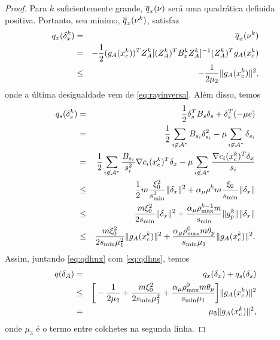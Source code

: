 \begin{proof}
Para $k$ suficientemente grande, $\overline{q}_x(\nu)$ será uma quadrática definida positiva.
 Portanto, seu mínimo, $\overline{q}_x(\nu^k)$, satisfaz
\begin{eqnarray}
 q_x(\delta_x^k) & = & \barra{q}_x(\nu^k) \nonumber \\
& = & -\meio(\gAk{k})^TZ_A^k[(Z_A^k)^T B_x^k Z_A^k]^{-1}(Z_A^k)^T\gAk{k} \nonumber \\
& \leq & - \frac{1}{2\mu_2}\norma{\gAk{k}}^2, \visiblelbl{eq:qdhnx}
\end{eqnarray}
onde a última desigualdade vem de \eqref{eq:rayinversa}.
Além disso, temos
\begin{eqnarray}
 q_s(\delta_s^k) & = & \meio\delta_s^TB_s\delta_s + \delta_s^T(-\mu e) \nonumber \\
& = & \meio \sum_{i \not\in\mathcal{A}^*}B_{s_i}\delta_{s_i}^2 - 
\mu\sum_{i \not\in\mathcal{A}^*}\delta_{s_i} \nonumber \\
& = & \meio\sum_{i \not\in\mathcal{A}^*}\frac{B_{s_i}}{s_i^2} \nabla c_i(\xc{k})^T\delta_x -
\mu \sum_{i \not\in\mathcal{A}^*}\frac{ \nabla c_i(\xc{k})^T\delta_x }{s_i} \nonumber \\
& \leq & \meio m \frac{\xi_0^2}{s_{\min}^2}\norma{\delta_x}^2 + 
\alpha_{\mu}\rho^k m \frac{\xi_0}{s_{\min}} \norma{\delta_x} \nonumber \\
& \leq & \frac{m \xi_0^2}{2 s_{\min}}\norma{\delta_x}^2 + \frac { \alpha_{\mu}
\rhomax^{k-1} m} {s_{\min}} \norma{g_p^k}\norma{\delta_x} \nonumber \\
& \leq & \frac{m \xi_0^2}{2 s_{\min} \mu_1^2}\norma{ g_A(\xc{k}) }^2
+ \frac{\alpha_{\mu}\rhomax^0 m \theta_p}{s_{\min}\mu_1} \norma{g_A(\xc{k})}^2.
\visiblelbl{eq:qdhns}
\end{eqnarray}
Assim, juntando \eqref{eq:qdhnx} com \eqref{eq:qdhns}, temos
\begin{eqnarray}
 q(\delta_A) & = & q_x(\delta_x) + q_s(\delta_s) \nonumber \\
& \leq & \bigg[-\frac{1}{2\mu_2} + \frac{m\xi_0^2}{2s_{\min}\mu_1^2} +
\frac{\alpha_{\mu}\rhomax^0 m \theta_p}{s_{\min}\mu_1}\bigg]\norma{g_A(\xc{k})}^2 \nonumber \\
& = & \mu_3\norma{g_A(\xc{k})}^2, \visiblelbl{eq:qdhn}
\end{eqnarray}
onde $\mu_3$ é o termo entre colchetes na segunda linha.


\end{proof}
